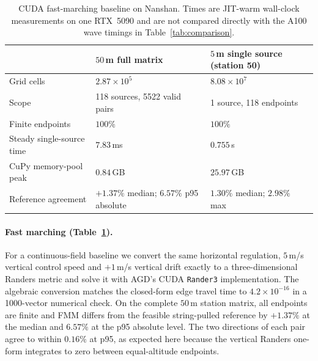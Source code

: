 \begin{table}[t]
\centering
\caption{CUDA fast-marching baseline on Nanshan. Times are JIT-warm
wall-clock measurements on one RTX~5090 and are not compared directly
with the A100 wave timings in Table~\ref{tab:comparison}.}
\label{tab:fmm-baseline}
\small
\begin{tabular}{lll}
\toprule
 & $50\,$m full matrix & $5\,$m single source (station 50) \\
\midrule
Grid cells & $2.87\times10^5$ & $8.08\times10^7$ \\
Scope & 118 sources, 5522 valid pairs & 1 source, 118 endpoints \\
Finite endpoints & $100\%$ & $100\%$ \\
Steady single-source time & $7.83\,$ms & $0.755\,$s \\
CuPy memory-pool peak & $0.84\,$GB & $25.97\,$GB \\
Reference agreement & $+1.37\%$ median; $6.57\%$ p95 absolute & $1.30\%$ median; $2.98\%$ max\footnotemark \\
\bottomrule
\end{tabular}
\end{table}

\paragraph{Fast marching (Table~\ref{tab:fmm-baseline}).}
For a continuous-field baseline we convert the same horizontal
regulation, $5\,$m/s vertical control speed and $+1\,$m/s vertical
drift exactly to a three-dimensional Randers metric and solve it with
AGD's CUDA \texttt{Rander3} implementation. The algebraic conversion
matches the closed-form edge travel time to $4.2\times10^{-16}$ in a
1000-vector numerical check. On the complete $50\,$m station matrix,
all endpoints are finite and FMM differs from the feasible
string-pulled reference by $+1.37\%$ at the median and $6.57\%$ at the
p95 absolute level. The two directions of each pair agree to within
$0.16\%$ at p95, as expected here because the vertical Randers
one-form integrates to zero between equal-altitude endpoints.

